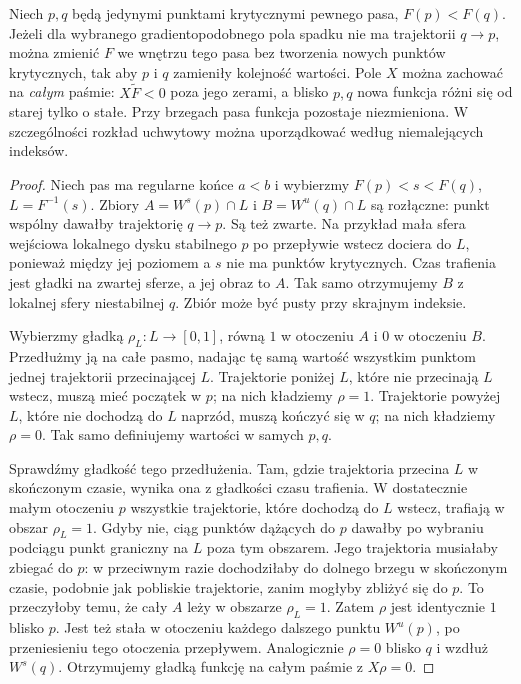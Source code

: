 \begin{twierdzenie}
\label{thm:przestawianie-18}
Niech $p,q$ będą jedynymi punktami krytycznymi
pewnego pasa, $F(p)<F(q)$.
Jeżeli dla wybranego gradientopodobnego pola
spadku nie ma trajektorii $q\to p$,
można zmienić $F$ we wnętrzu tego pasa
bez tworzenia nowych punktów krytycznych,
tak aby $p$ i $q$ zamieniły kolejność wartości.
Pole $X$ można zachować na \emph{całym} paśmie:
$X\widetilde F<0$ poza jego zerami, a blisko $p,q$
nowa funkcja różni się od starej tylko o stałe.
Przy brzegach pasa funkcja pozostaje niezmieniona.
W szczególności
rozkład uchwytowy można uporządkować
według niemalejących indeksów.
\end{twierdzenie}
\begin{proof}
Niech pas ma regularne końce $a<b$ i wybierzmy
$F(p)<s<F(q)$, $L=F^{-1}(s)$.
Zbiory $A=W^s(p)\cap L$ i $B=W^u(q)\cap L$
są rozłączne: punkt wspólny dawałby trajektorię $q\to p$.
Są też zwarte. Na przykład mała sfera wejściowa
lokalnego dysku stabilnego $p$ po przepływie wstecz
dociera do $L$, ponieważ między jej poziomem a $s$
nie ma punktów krytycznych. Czas trafienia jest
gładki na zwartej sferze, a jej obraz to $A$.
Tak samo otrzymujemy $B$ z lokalnej sfery niestabilnej $q$.
Zbiór może być pusty przy skrajnym indeksie.

Wybierzmy gładką $\rho_L:L\to[0,1]$, równą $1$
w otoczeniu $A$ i $0$ w otoczeniu $B$.
Przedłużmy ją na całe pasmo, nadając tę samą wartość
wszystkim punktom jednej trajektorii przecinającej $L$.
Trajektorie poniżej $L$, które nie przecinają $L$
wstecz, muszą mieć początek w $p$; na nich kładziemy $\rho=1$.
Trajektorie powyżej $L$, które nie dochodzą do $L$
naprzód, muszą kończyć się w $q$; na nich kładziemy $\rho=0$.
Tak samo definiujemy wartości w samych $p,q$.

Sprawdźmy gładkość tego przedłużenia.
Tam, gdzie trajektoria przecina $L$ w skończonym czasie,
wynika ona z gładkości czasu trafienia.
W dostatecznie małym otoczeniu $p$ wszystkie trajektorie,
które dochodzą do $L$ wstecz, trafiają w obszar $\rho_L=1$.
Gdyby nie, ciąg punktów dążących do $p$ dawałby
po wybraniu podciągu punkt graniczny na $L$ poza tym obszarem.
Jego trajektoria musiałaby zbiegać do $p$:
w przeciwnym razie dochodziłaby do dolnego brzegu
w skończonym czasie, podobnie jak pobliskie trajektorie,
zanim mogłyby zbliżyć się do $p$.
To przeczyłoby temu, że cały $A$ leży w obszarze $\rho_L=1$.
Zatem $\rho$ jest identycznie $1$ blisko $p$.
Jest też stała w otoczeniu każdego dalszego punktu
$W^u(p)$, po przeniesieniu tego otoczenia przepływem.
Analogicznie $\rho=0$ blisko $q$ i wzdłuż $W^s(q)$.
Otrzymujemy gładką funkcję na całym paśmie z $X\rho=0$.


\end{proof}
